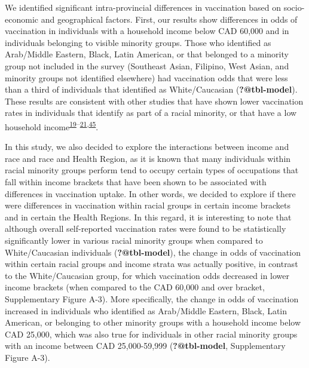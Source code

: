\documentclass[
  letterpaper,
  DIV=11,
  numbers=noendperiod]{scrartcl}
\begin{document}
We identified significant intra-provincial differences in vaccination
based on socio-economic and geographical factors. First, our results
show differences in odds of vaccination in individuals with a household
income below CAD 60,000 and in individuals belonging to visible minority
groups. Those who identified as Arab/Middle Eastern, Black, Latin
American, or that belonged to a minority group not included in the
survey (Southeast Asian, Filipino, West Asian, and minority groups not
identified elsewhere) had vaccination odds that were less than a third
of individuals that identified as White/Caucasian
(\textbf{?@tbl-model}). These results are consistent with other studies
that have shown lower vaccination rates in individuals that identify as
part of a racial minority, or that have a low household
income\textsuperscript{\protect\hyperlink{ref-guay2022}{19}--\protect\hyperlink{ref-hussain2022}{21},\protect\hyperlink{ref-carter2022}{45}}.

In this study, we also decided to explore the interactions between
income and race and race and Health Region, as it is known that many
individuals within racial minority groups perform tend to occupy certain
types of occupations that fall within income brackets that have been
shown to be associated with differences in vaccination uptake. In other
words, we decided to explore if there were differences in vaccination
within racial groups in certain income brackets and in certain the
Health Regions. In this regard, it is interesting to note that although
overall self-reported vaccination rates were found to be statistically
significantly lower in various racial minority groups when compared to
White/Caucasian individuals (\textbf{?@tbl-model}), the change in odds
of vaccination within certain racial groups and income strata was
actually positive, in contrast to the White/Caucasian group, for which
vaccination odds decreased in lower income brackets (when compared to
the CAD 60,000 and over bracket, Supplementary Figure A-3). More
specifically, the change in odds of vaccination increased in individuals
who identified as Arab/Middle Eastern, Black, Latin American, or
belonging to other minority groups with a household income below CAD
25,000, which was also true for individuals in other racial minority
groups with an income between CAD 25,000-59,999 (\textbf{?@tbl-model},
Supplementary Figure A-3).
\end{document}
